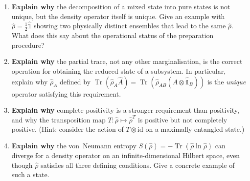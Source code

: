 \documentclass[11pt,a4paper]{article}
\begin{document}
\begin{tcolorbox}[gradconceptbox, title={Part I --- ``Explain Why'' \hfill\normalfont 4 $\times$ 2 pts = 8 pts}]

\begin{enumerate}[leftmargin=1.8em, label=\textbf{Q\arabic*.}, itemsep=14pt]

\item {}
  \textbf{Explain why} the decomposition of a mixed state into pure states is
  not unique, but the density operator itself is unique.
  Give an example with $\hat{\rho}=\tfrac{1}{2}\hat{\mathbb{1}}$ showing two
  physically distinct ensembles that lead to the same $\hat{\rho}$.
  What does this say about the operational status of the preparation procedure?

  \vspace{3cm}

\item {}
  \textbf{Explain why} the partial trace, not any other marginalisation, is the
  correct operation for obtaining the reduced state of a subsystem.
  In particular, explain why $\hat{\rho}_A$ defined by
  $\operatorname{Tr}(\hat{\rho}_A\hat{A})=\operatorname{Tr}(\hat{\rho}_{AB}(\hat{A}\otimes\hat{\mathbb{1}}_B))$
  is the \emph{unique} operator satisfying this requirement.

  \vspace{3cm}

\item {}
  \textbf{Explain why} complete positivity is a stronger requirement than
  positivity, and why the transposition map $T:\hat{\rho}\mapsto\hat{\rho}^T$
  is positive but not completely positive.
  (Hint: consider the action of $T\otimes\mathrm{id}$ on a maximally entangled state.)

  \vspace{3cm}

\item {}
  \textbf{Explain why} the von~Neumann entropy $S(\hat{\rho})=-\operatorname{Tr}(\hat{\rho}\ln\hat{\rho})$
  can diverge for a density operator on an infinite-dimensional Hilbert space,
  even though $\hat{\rho}$ satisfies all three defining conditions.
  Give a concrete example of such a state.

  \vspace{3cm}

\end{enumerate}
\end{tcolorbox}
\end{document}
